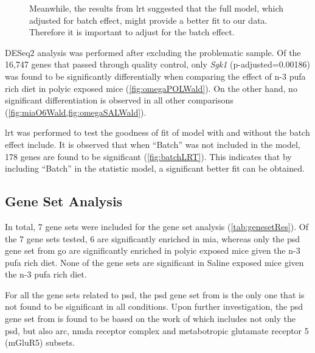 \begin{figure}
{		Meanwhile, the results from \gls{lrt} suggested that the full model, which adjusted for batch effect, might provide a better fit to our data. 
		Therefore it is important to adjust for the batch effect. } 
	\label{fig:waldQQ}
\end{figure}
DESeq2 analysis was performed after excluding the problematic sample.
Of the 16,747 genes that passed through quality control, only \textit{Sgk1} (p-adjusted=0.00186) was found to be significantly differentially when comparing the effect of n-3 \gls{pufa} rich diet in \gls{polyic} exposed mice (\cref{fig:omegaPOLWald}).
On the other hand, no significant differentiation is observed in all other comparisons (\cref{fig:miaO6Wald,fig:omegaSALWald}).

\gls{lrt} was performed to test the goodness of fit of model with and without the batch effect include. 
It is observed that when ``Batch'' was not included in the model, 178 genes are found to be significant (\cref{fig:batchLRT}).
This indicates that by including ``Batch'' in the statistic model, a significant better fit can be obtained. 

\subsection{Gene Set Analysis}
In total, 7 gene sets were included for the gene set analysis (\cref{tab:genesetRes}).
Of the 7 gene sets tested, 6 are significantly enriched in \gls{mia}, whereas only the \gls{psd} gene set from \gls{go} are significantly enriched in \gls{polyic} exposed mice given the n-3 \gls{pufa} rich diet. 
None of the gene sets are significant in Saline exposed mice given the n-3 \gls{pufa} rich diet. 

For all the gene sets related to \gls{psd}, the \gls{psd} gene set from \citet{Purcell2014} is the only one that is not found to be significant in all conditions.
Upon further investigation, the \gls{psd} gene set from \citet{Purcell2014} is found to be based on the work of \citet{Kirov2012} which includes not only the \gls{psd}, but also \gls{arc}, \gls{nmda} receptor complex and metabotropic glutamate receptor 5 (mGluR5) subsets.


